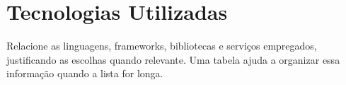 \section{Tecnologias Utilizadas}

Relacione as linguagens, frameworks, bibliotecas e serviços empregados,
justificando as escolhas quando relevante. Uma tabela ajuda a organizar essa
informação quando a lista for longa.
